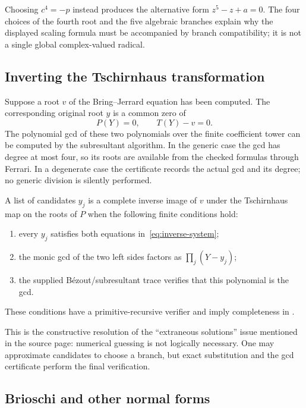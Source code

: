 Choosing \(c^4=-p\) instead produces the alternative form
\(z^5-z+a=0\).  The four choices of the fourth root and the five algebraic
branches explain why the displayed scaling formula must be accompanied by
branch compatibility; it is not a single global complex-valued radical.

\subsection{Inverting the Tschirnhaus transformation}

Suppose a root \(v\) of the Bring--Jerrard equation has been computed.  The
corresponding original root \(y\) is a common zero of
\begin{equation}\label{eq:inverse-system}
 P(Y)=0,
 \qquad T(Y)-v=0.
\end{equation}
The polynomial gcd of these two polynomials over the finite coefficient tower
can be computed by the subresultant algorithm.  In the generic case the gcd
has degree at most four, so its roots are available from the checked formulas
through Ferrari.  In a degenerate case the certificate records the actual gcd
and its degree; no generic division is silently performed.

\begin{proposition}
A list of candidates \(y_j\) is a complete inverse image of \(v\) under the
Tschirnhaus map on the roots of \(P\) when the following finite conditions
hold:
\begin{enumerate}
\item every \(y_j\) satisfies both equations in~\eqref{eq:inverse-system};
\item the monic gcd of the two left sides factors as \(\prod_j(Y-y_j)\);
\item the supplied Bézout/subresultant trace verifies that this polynomial is
      the gcd.
\end{enumerate}
These conditions have a primitive-recursive verifier and imply completeness in
\ipra.
\end{proposition}

This is the constructive resolution of the ``extraneous solutions'' issue
mentioned in the source page: numerical guessing is not logically necessary.
One may approximate candidates to choose a branch, but exact substitution and
the gcd certificate perform the final verification.

\subsection{Brioschi and other normal forms}

